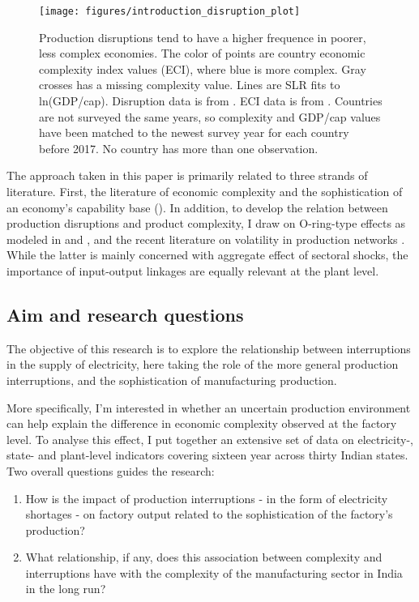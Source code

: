 \documentclass[11pt]{article}
\begin{document}
\begin{figure}[htpb]
	\centering
	\texttt{[image: figures/introduction\_disruption\_plot]}
	\caption{Production disruptions tend to have a higher frequence in poorer, less complex economies. The color of points are country economic complexity index values (ECI), where blue is more complex. Gray crosses has a missing complexity value. Lines are SLR fits to ln(GDP/cap). Disruption data is from \cite{world_bank_enterprise_2020}. ECI data is from \cite{simoes_economic_2011}. Countries are not surveyed the same years, so complexity and GDP/cap values have been matched to the newest survey year for each country before 2017. No country has more than one observation.}
	\label{fig:disruption-fig}
\end{figure}

The approach taken in this paper is primarily related to three strands of literature. First, the literature of economic complexity and the sophistication of an economy's capability base  (\citealp{frenken_related_2007,hausmann_atlas_2013,tacchella_new_2012}). In addition, to develop the relation between production disruptions and product complexity, I draw on O-ring-type effects as modeled in \cite{kremer_o-ring_1993} and \cite{jones_intermediate_2011}, and the recent literature on volatility in production networks \citep{acemoglu_network_2012}. While the latter is mainly concerned with aggregate effect of sectoral shocks, the importance of input-output linkages are equally relevant at the plant level.

\subsection{Aim and research questions}%
\label{sub:aim_and_research_questions}
The objective of this research is to explore the relationship between interruptions in the supply of electricity, here taking the role of the more general production interruptions, and the sophistication of manufacturing production.

More specifically, I'm interested in whether an uncertain production environment can help explain the difference in economic complexity observed at the factory level. To analyse this effect, I put together an extensive set of data on electricity-, state- and plant-level indicators covering sixteen year across thirty Indian states. Two overall questions guides the research: 

\begin{enumerate}

\item How is the impact of production interruptions - in the form of electricity shortages - on factory output related to the sophistication of the factory's production?

\item What relationship, if any, does this association between complexity and interruptions have with the complexity of the manufacturing sector in India in the long run?

\end{enumerate}
\end{document}
